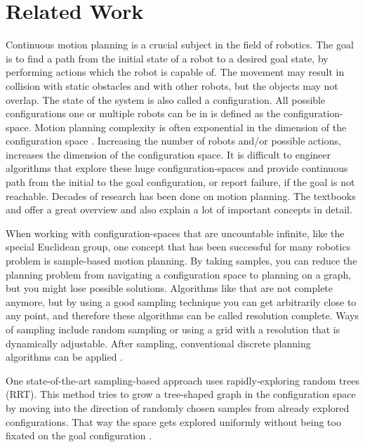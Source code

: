 \section{Related Work}

Continuous motion planning is a crucial subject in the field of robotics.
The goal is to find a path from the initial state of a robot to a desired goal state, by performing actions which the robot is capable of.
The movement may result in collision with static obstacles and with other robots, but the objects may not overlap.
The state of the system is also called a configuration.
All possible configurations one or multiple robots can be in is defined as the configuration-space.
Motion planning complexity is often exponential in the dimension of the configuration space \cite{LaValle2006}.
Increasing the number of robots and/or possible actions, increases the dimension of the configuration space.
It is difficult to engineer algorithms that explore these huge configuration-spaces and provide continuous path from the initial to the goal configuration, or report failure, if the goal is not reachable.
Decades of research has been done on motion planning.
The textbooks \cite{LaValle2006} and \cite{Mueller2019} offer a great overview and also explain a lot of important concepts in detail.

When working with configuration-spaces that are uncountable infinite, like the special Euclidean group, one concept that has been successful for many robotics problem is sample-based motion planning.
By taking samples, you can reduce the planning problem from navigating a configuration space to planning on a graph, but you might lose possible solutions.
Algorithms like that are not complete anymore, but by using a good sampling technique you can get arbitrarily close to any point, and therefore these algorithms can be called resolution complete.
Ways of sampling include random sampling or using a grid with a resolution that is dynamically adjustable.
After sampling, conventional discrete planning algorithms can be applied \cite{LaValle2006}.

One state-of-the-art sampling-based approach uses rapidly-exploring random trees (RRT).
This method tries to grow a tree-shaped graph in the configuration space by moving into the direction of randomly chosen samples from already explored configurations. That way the space gets explored uniformly without being too fixated on the goal configuration \cite{lavalle1998,lavalle2001}.

